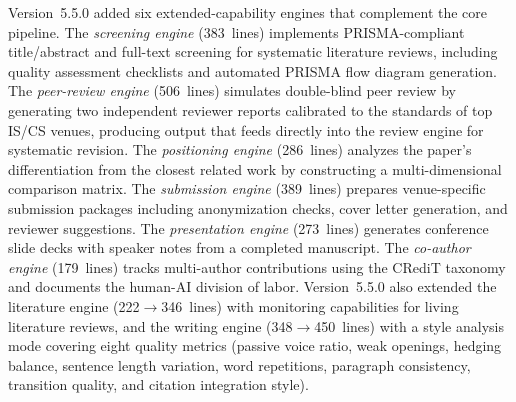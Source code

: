 \documentclass{article}
\begin{document}
Version~5.5.0 added six extended-capability engines that complement the core pipeline. The \emph{screening engine} (383~lines) implements PRISMA-compliant title/abstract and full-text screening for systematic literature reviews, including quality assessment checklists and automated PRISMA flow diagram generation. The \emph{peer-review engine} (506~lines) simulates double-blind peer review by generating two independent reviewer reports calibrated to the standards of top IS/CS venues, producing output that feeds directly into the review engine for systematic revision. The \emph{positioning engine} (286~lines) analyzes the paper's differentiation from the closest related work by constructing a multi-dimensional comparison matrix. The \emph{submission engine} (389~lines) prepares venue-specific submission packages including anonymization checks, cover letter generation, and reviewer suggestions. The \emph{presentation engine} (273~lines) generates conference slide decks with speaker notes from a completed manuscript. The \emph{co-author engine} (179~lines) tracks multi-author contributions using the CRediT taxonomy and documents the human-AI division of labor. Version~5.5.0 also extended the literature engine (222$\to$346~lines) with monitoring capabilities for living literature reviews, and the writing engine (348$\to$450~lines) with a style analysis mode covering eight quality metrics (passive voice ratio, weak openings, hedging balance, sentence length variation, word repetitions, paragraph consistency, transition quality, and citation integration style).
\end{document}
